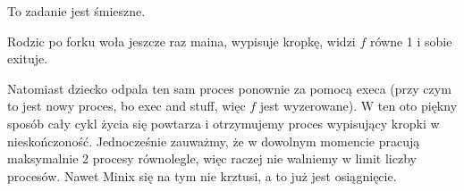 To zadanie jest śmieszne.

Rodzic po forku woła jeszcze raz maina, wypisuje kropkę, widzi $f$ równe 1 i sobie exituje.

Natomiast dziecko odpala ten sam proces ponownie za pomocą execa (przy czym to jest nowy proces, bo exec and stuff, więc $f$ jest wyzerowane). W ten oto piękny sposób cały cykl życia się powtarza i otrzymujemy proces wypisujący kropki w nieskończoność. Jednocześnie zauważmy, że w dowolnym momencie pracują maksymalnie 2 procesy równolegle, więc raczej nie walniemy w limit liczby procesów. Nawet Minix się na tym nie krztusi, a to już jest osiągnięcie.